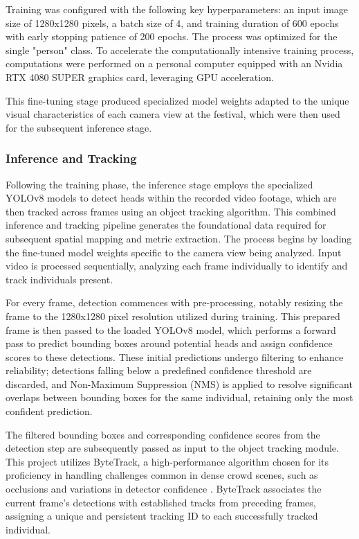 Training was configured with the following key hyperparameters: an input image size of 1280x1280 pixels, a batch size of 4, and training duration of 600 epochs with early stopping patience of 200 epochs. The process was optimized for the single "person" class. To accelerate the computationally intensive training process, computations were performed on a personal computer equipped with an Nvidia RTX 4080 SUPER graphics card, leveraging GPU acceleration.

This fine-tuning stage produced specialized model weights adapted to the unique visual characteristics of each camera view at the festival, which were then used for the subsequent inference stage.

\subsubsection{Inference and Tracking}
Following the training phase, the inference stage employs the specialized YOLOv8 models to detect heads within the recorded video footage, which are then tracked across frames using an object tracking algorithm. This combined inference and tracking pipeline generates the foundational data required for subsequent spatial mapping and metric extraction. The process begins by loading the fine-tuned model weights specific to the camera view being analyzed. Input video is processed sequentially, analyzing each frame individually to identify and track individuals present.

For every frame, detection commences with pre-processing, notably resizing the frame to the 1280x1280 pixel resolution utilized during training. This prepared frame is then passed to the loaded YOLOv8 model, which performs a forward pass to predict bounding boxes around potential heads and assign confidence scores to these detections. These initial predictions undergo filtering to enhance reliability; detections falling below a predefined confidence threshold are discarded, and Non-Maximum Suppression (NMS) is applied to resolve significant overlaps between bounding boxes for the same individual, retaining only the most confident prediction.

The filtered bounding boxes and corresponding confidence scores from the detection step are subsequently passed as input to the object tracking module. This project utilizes ByteTrack, a high-performance algorithm chosen for its proficiency in handling challenges common in dense crowd scenes, such as occlusions and variations in detector confidence \cite{bytetrack}. ByteTrack associates the current frame's detections with established tracks from preceding frames, assigning a unique and persistent tracking ID to each successfully tracked individual.


